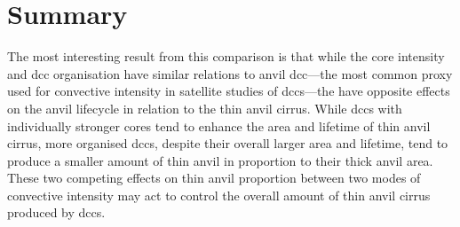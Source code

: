 \section{Summary}

The most interesting result from this comparison is that while the core intensity and \acrshort{dcc} organisation have similar relations to anvil \acrshort{dcc}---the most common proxy used for convective intensity in satellite studies of \acrshort{dcc}s---the have opposite effects on the anvil lifecycle in relation to the thin anvil cirrus.
While \acrshort{dcc}s with individually stronger cores tend to enhance the area and lifetime of thin anvil cirrus, more organised \acrshort{dcc}s, despite their overall larger area and lifetime, tend to produce a smaller amount of thin anvil in proportion to their thick anvil area.
These two competing effects on thin anvil proportion between two modes of convective intensity may act to control the overall amount of thin anvil cirrus produced by \acrshort{dcc}s.
